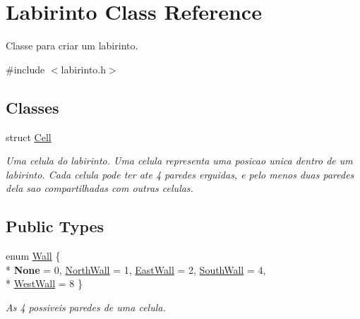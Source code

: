 \hypertarget{class_labirinto}{}\section{Labirinto Class Reference}
\label{class_labirinto}


Classe para criar um labirinto.  




{\ttfamily \#include $<$labirinto.\+h$>$}

\subsection*{Classes}
\begin{DoxyCompactItemize}
\item 
struct \hyperlink{struct_labirinto_1_1_cell}{Cell}
\begin{DoxyCompactList}\small\item\em Uma celula do labirinto. Uma celula representa uma posicao unica dentro de um labirinto. Cada celula pode ter ate 4 paredes erguidas, e pelo menos duas paredes dela sao compartilhadas com outras celulas. \end{DoxyCompactList}\end{DoxyCompactItemize}
\subsection*{Public Types}
\begin{DoxyCompactItemize}
\item 
enum \hyperlink{class_labirinto_ab6ffda1571ea6394c382e12b4bb4c336}{Wall} \{ \\*
{\bfseries None} = 0, 
\hyperlink{class_labirinto_ab6ffda1571ea6394c382e12b4bb4c336a51cd26ae8c945f233f769e8f825576b7}{North\+Wall} = 1, 
\hyperlink{class_labirinto_ab6ffda1571ea6394c382e12b4bb4c336aa4d6ec05499a34df7626c5163cb8c6c6}{East\+Wall} = 2, 
\hyperlink{class_labirinto_ab6ffda1571ea6394c382e12b4bb4c336a0b35a31c56ee4c65e64e479bd6b77d43}{South\+Wall} = 4, 
\\*
\hyperlink{class_labirinto_ab6ffda1571ea6394c382e12b4bb4c336a5f71f0a5c304ca89e2aee5d8159b6d39}{West\+Wall} = 8
 \}
\begin{DoxyCompactList}\small\item\em As 4 possiveis paredes de uma celula. \end{DoxyCompactList}\end{DoxyCompactItemize}
